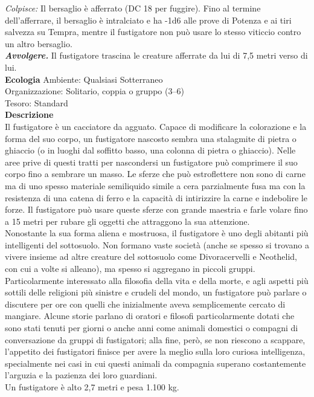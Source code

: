 \begin{multicols}{2}
\emph{Colpisce:} Il bersaglio è afferrato (DC  18 per fuggire). Fino al termine dell'afferrare, il bersaglio è intralciato e ha -1d6 alle prove di Potenza e ai tiri salvezza su Tempra, mentre il fustigatore non può usare lo stesso viticcio contro un altro bersaglio.\\
\emph{\textbf{Avvolgere.}} Il fustigatore trascina le creature afferrate da lui di 7,5 metri verso di lui.\\
\textbf{Ecologia}
Ambiente: Qualsiasi Sotterraneo\\
Organizzazione: Solitario, coppia o gruppo (3–6)\\
Tesoro: Standard\\
\textbf{Descrizione}\\
Il fustigatore è un cacciatore da agguato. Capace di modificare la colorazione e la forma del suo corpo, un fustigatore nascosto sembra una stalagmite di pietra o ghiaccio (o in luoghi dal soffitto basso, una colonna di pietra o ghiaccio). Nelle aree prive di questi tratti per nascondersi un fustigatore può comprimere il suo corpo fino a sembrare un masso. Le sferze che può estroflettere non sono di carne ma di uno spesso materiale semiliquido simile a cera parzialmente fusa ma con la resistenza di una catena di ferro e la capacità di intirizzire la carne e indebolire le forze. Il fustigatore può usare queste sferze con grande maestria e farle volare fino a 15 metri per rubare gli oggetti che attraggono la sua attenzione.\\

Nonostante la sua forma aliena e mostruosa, il fustigatore è uno degli abitanti più intelligenti del sottosuolo. Non formano vaste società (anche se spesso si trovano a vivere insieme ad altre creature del sottosuolo come Divoracervelli e Neothelid, con cui a volte si alleano), ma spesso si aggregano in piccoli gruppi. Particolarmente interessato alla filosofia della vita e della morte, e agli aspetti più sottili delle religioni più sinistre e crudeli del mondo, un fustigatore può parlare o discutere per ore con quelli che inizialmente aveva semplicemente cercato di mangiare. Alcune storie parlano di oratori e filosofi particolarmente dotati che sono stati tenuti per giorni o anche anni come animali domestici o compagni di conversazione da gruppi di fustigatori; alla fine, però, se non riescono a scappare, l’appetito dei fustigatori finisce per avere la meglio sulla loro curiosa intelligenza, specialmente nei casi in cui questi animali da compagnia superano costantemente l’arguzia e la pazienza dei loro guardiani.\\
Un fustigatore è alto 2,7 metri e pesa 1.100 kg.\\


\end{multicols}
